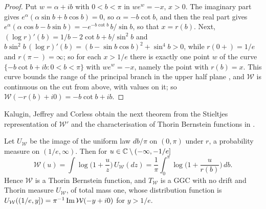 \begin{proof}
Put $w=\alpha+ib$ with $0<b<\pi$ in $we^w=-x$, $x>0$. The imaginary part gives $e^\alpha(\alpha\sin b+b\cos b)=0$, so $\alpha=-b\cot b$, and then the real part gives $e^\alpha(\alpha\cos b-b\sin b)=-e^{-b\cot b}\,b/\sin b$, so that $x=r(b)$. Next, $(\log r)'(b)=1/b-2\cot b+b/\sin^2b$ and $b\sin^2b\,(\log r)'(b)=(b-\sin b\cos b)^2+\sin^4b>0$, while $r(0+)=1/e$ and $r(\pi-)=\infty$; so for each $x>1/e$ there is exactly one point $w$ of the curve $\{-b\cot b+ib:0<b<\pi\}$ with $we^w=-x$, namely the point with $r(b)=x$. This curve bounds the range of the principal branch in the upper half plane \cite[Section 4]{Corless96}, and $\mathcal W$ is continuous on the cut from above, with values on it; so $\mathcal W(-r(b)+i0)=-b\cot b+ib$.
\end{proof}

Kalugin, Jeffrey and Corless obtain the next theorem from the Stieltjes representation of $\mathcal W'$ \cite[Theorem 3.3]{KJC11} and the characterisation of Thorin Bernstein functions in \cite[Chapter 8]{boSSV}.

\begin{theorem}\label{pk:thm:lambert}
Let $U_{\mathcal W}$ be the image of the uniform law $db/\pi$ on $(0,\pi)$ under $r$, a probability measure on $(1/e,\infty)$. Then for $u\in\mathbb{C}\setminus(-\infty,-1/e]$
\[
\mathcal W(u)=\int\log\Big(1+\frac uz\Big)\,U_{\mathcal W}(dz)=\frac1\pi\int_0^\pi\log\Big(1+\frac u{r(b)}\Big)\,db .
\]
Hence $\mathcal W$ is a Thorin Bernstein function, and $T_{\mathcal W}$ is a GGC with no drift and Thorin measure $U_{\mathcal W}$, of total mass one, whose distribution function is $U_{\mathcal W}((1/e,y])=\pi^{-1}\operatorname{Im}\mathcal W(-y+i0)$ for $y>1/e$.
\end{theorem}


